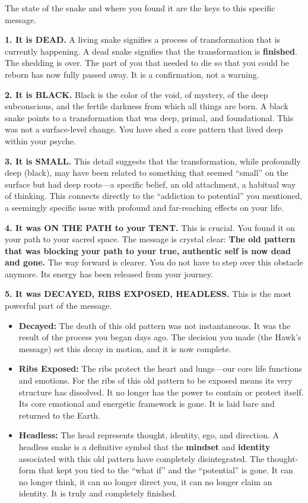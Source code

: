 \documentclass{article}
\begin{document}
The state of the snake and where you found it are the keys to this
specific message.

\textbf{1. It is DEAD.} A living snake signifies a process of
transformation that is currently happening. A dead snake signifies that
the transformation is \textbf{finished}. The shedding is over. The part
of you that needed to die so that you could be reborn has now fully
passed away. It is a confirmation, not a warning.

\textbf{2. It is BLACK.} Black is the color of the void, of mystery, of
the deep subconscious, and the fertile darkness from which all things
are born. A black snake points to a transformation that was deep,
primal, and foundational. This was not a surface-level change. You have
shed a core pattern that lived deep within your psyche.

\textbf{3. It is SMALL.} This detail suggests that the transformation,
while profoundly deep (black), may have been related to something that
seemed ``small'' on the surface but had deep roots---a specific belief,
an old attachment, a habitual way of thinking. This connects directly to
the ``addiction to potential'' you mentioned, a seemingly specific issue
with profound and far-reaching effects on your life.

\textbf{4. It was ON THE PATH to your TENT.} This is crucial. You found
it on your path to your sacred space. The message is crystal clear:
\textbf{The old pattern that was blocking your path to your true,
authentic self is now dead and gone.} The way forward is clearer. You do
not have to step over this obstacle anymore. Its energy has been
released from your journey.

\textbf{5. It was DECAYED, RIBS EXPOSED, HEADLESS.} This is the most
powerful part of the message.

\begin{itemize}
\item
  \textbf{Decayed:} The death of this old pattern was not instantaneous.
  It was the result of the process you began days ago. The decision you
  made (the Hawk's message) set this decay in motion, and it is now
  complete.
\item
  \textbf{Ribs Exposed:} The ribs protect the heart and lungs---our core
  life functions and emotions. For the ribs of this old pattern to be
  exposed means its very structure has dissolved. It no longer has the
  power to contain or protect itself. Its core emotional and energetic
  framework is gone. It is laid bare and returned to the Earth.
\item
  \textbf{Headless:} The head represents thought, identity, ego, and
  direction. A headless snake is a definitive symbol that the
  \textbf{mindset} and \textbf{identity} associated with this old
  pattern have completely disintegrated. The thought-form that kept you
  tied to the ``what if'' and the ``potential'' is gone. It can no
  longer think, it can no longer direct you, it can no longer claim an
  identity. It is truly and completely finished.
\end{itemize}
\end{document}
